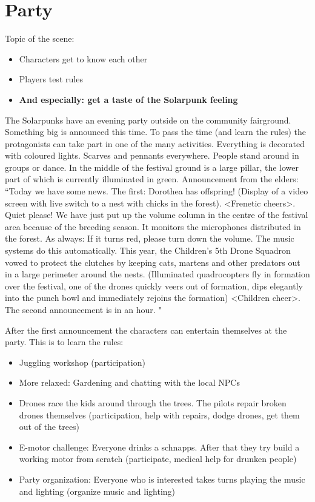 
\section{Party}

Topic of the scene: 
\begin{itemize}
\item Characters get to know each other
\item Players test rules
\item \bf{And especially: get a taste of the Solarpunk feeling}
\end{itemize}

The Solarpunks have an evening party outside on the community fairground. Something big is announced this time. To pass the time (and learn the rules) the protagonists can take part in one of the many activities. 
Everything is decorated with coloured lights. Scarves and pennants everywhere. People stand around in groups or dance. In the middle of the festival ground is a large pillar, the lower part of which is currently illuminated in green.
Announcement from the elders: “Today we have some news. The first: Dorothea has offspring! (Display of a video screen with live switch to a nest with chicks in the forest). <Frenetic cheers>. Quiet please! We have just put up the volume column in the centre of the festival area because of the breeding season.
It monitors the microphones distributed in the forest.
As always: If it turns red, please turn down the volume. The music systems do this automatically. This year, the Children's 5th Drone Squadron vowed to protect the clutches by keeping cats, martens and other predators out in a large perimeter around the nests. (Illuminated quadrocopters fly in formation over the festival, one of the drones quickly veers out of formation, dips elegantly into the punch bowl and immediately rejoins the formation) <Children cheer>.
The second announcement is in an hour.
"

After the first announcement the characters can entertain themselves at the party. This is to learn the rules:

\begin{itemize}
\item Juggling workshop (participation)
\item More relaxed: Gardening and chatting with the local NPCs
\item Drones race the kids around through the trees. The pilots repair broken drones themselves (participation, help with repairs, dodge drones, get them out of the trees)
\item E-motor challenge: Everyone drinks a schnapps. After that they try build a working motor from scratch (participate, medical help for drunken people)
\item Party organization: Everyone who is interested takes turns playing the music and lighting (organize music and lighting)
\end{itemize}

